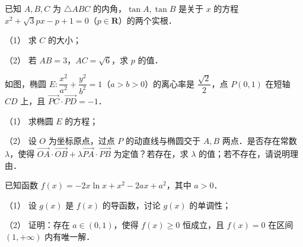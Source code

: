 \begin{question}
已知 \(A,B,C\) 为 \(\triangle ABC\) 的内角，\(\tan A,\tan B\) 是关于 \(x\) 的方程 \(x^2+\sqrt{3}px-p+1=0\)（\(p\in\mathbf{R}\)）的两个实根．

（1） 求 \(C\) 的大小；

（2） 若 \(AB=3\)，\(AC=\sqrt{6}\)，求 \(p\) 的值．

\Needspace{0.4\textheight}
\end{question}
\begin{question}
如图，椭圆 \(E:\dfrac{x^2}{a^2}+\dfrac{y^2}{b^2}=1\)（\(a>b>0\)）的离心率是 \(\dfrac{\sqrt{2}}{2}\)，点 \(P(0,1)\) 在短轴 \(CD\) 上，且 \(\overrightarrow{PC}\cdot\overrightarrow{PD}=-1\)．
\nopagebreak[4]
\begin{center}\end{center}
\nopagebreak[4]
（1） 求椭圆 \(E\) 的方程；

（2） 设 \(O\) 为坐标原点，过点 \(P\) 的动直线与椭圆交于 \(A,B\) 两点．是否存在常数 \(\lambda\)，使得 \(\overrightarrow{OA}\cdot\overrightarrow{OB}+\lambda\overrightarrow{PA}\cdot\overrightarrow{PB}\) 为定值？若存在，求 \(\lambda\) 的值；若不存在，请说明理由．

\end{question}
\begin{question}
已知函数 \(f(x)=-2x\ln x+x^2-2ax+a^2\)，其中 \(a>0\)．

（1） 设 \(g(x)\) 是 \(f(x)\) 的导函数，讨论 \(g(x)\) 的单调性；

（2） 证明：存在 \(a\in(0,1)\)，使得 \(f(x)\geqslant 0\) 恒成立，且 \(f(x)=0\) 在区间 \((1,+\infty)\) 内有唯一解．

\end{question}